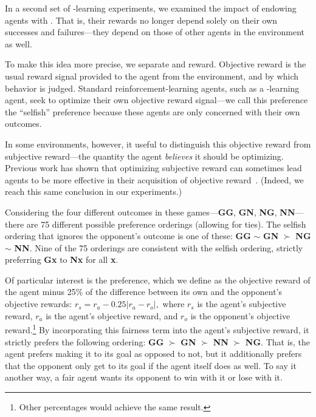 
In a second set of \Q-learning experiments, we examined the impact of
endowing agents with . That is, their
rewards no longer depend solely on their own successes and
failures---they depend on those of other agents in the environment as
well.

To make this idea more precise, we separate  and
 reward. Objective reward is the usual reward
signal provided to the agent from the environment, and by which
behavior is judged. Standard reinforcement-learning agents, such as a
\Q-learning agent, seek to optimize their own objective reward
signal---we call this preference the ``selfish'' preference because
these agents are only concerned with their own outcomes.

In some environments, however, it useful to distinguish this objective
reward from subjective reward---the quantity the agent \emph{believes}
it should be optimizing. Previous work has shown that optimizing
subjective reward can sometimes lead agents to be more effective in
their acquisition of objective reward~\cite{singh2009rewards}.  (Indeed, we
reach this same conclusion in our experiments.)

Considering the four different outcomes in these games---{\bf GG},
{\bf GN}, {\bf NG}, {\bf NN}---there are 75 different possible
preference orderings (allowing for ties). The selfish ordering that
ignores the opponent's outcome is one of these:
{\bf GG} $\sim$ {\bf GN} $\succ$ {\bf NG} $\sim$ {\bf NN}.
Nine of the 75 orderings are consistent with the selfish ordering,
strictly preferring {\bf Gx} to {\bf Nx} for all {\bf x}.

Of particular interest is the  preference, which we define
as the objective reward of the agent minus 25\% of the difference
between its own and the opponent's objective rewards:
$r_{s} = r_{a} - 0.25 \left| r_{a} - r_{o} \right|,$ where $r_{s}$
is the agent's subjective reward, $r_{a}$ is the agent's objective
reward, and $r_{o}$ is the opponent's objective reward.\footnote{Other
percentages would achieve the same result.}  By incorporating this
fairness term into the agent's subjective reward, it strictly prefers
the following ordering:
{\bf GG} $\succ$ \mbox{\bf GN} $\succ$ \mbox {\bf NN} $\succ$ {\bf NG}.
That is, the agent prefers making it to its goal as opposed to not,
but it additionally prefers that the opponent only get to its goal if
the agent itself does as well. To say it another way, a fair agent
wants its opponent to win with it or lose with it.

